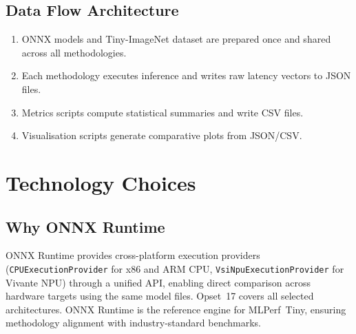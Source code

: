 
\subsection{Data Flow Architecture}

\begin{enumerate}[itemsep=1pt, topsep=3pt]
    \item ONNX models and Tiny-ImageNet dataset are prepared once and shared
          across all methodologies.
    \item Each methodology executes inference and writes raw latency vectors
          to JSON files.
    \item Metrics scripts compute statistical summaries and write CSV files.
    \item Visualisation scripts generate comparative plots from JSON/CSV.
\end{enumerate}

\section{Technology Choices}
\label{sec:technology_choices}

\subsection{Why ONNX Runtime}

ONNX Runtime provides cross-platform execution providers
(\texttt{CPUExecutionProvider} for x86 and ARM CPU,
\texttt{VsiNpuExecutionProvider} for Vivante NPU) through a unified API,
enabling direct comparison across hardware targets using the same model files.
Opset~17 covers all selected architectures. ONNX Runtime is the reference
engine for MLPerf~Tiny, ensuring methodology alignment with industry-standard
benchmarks.

